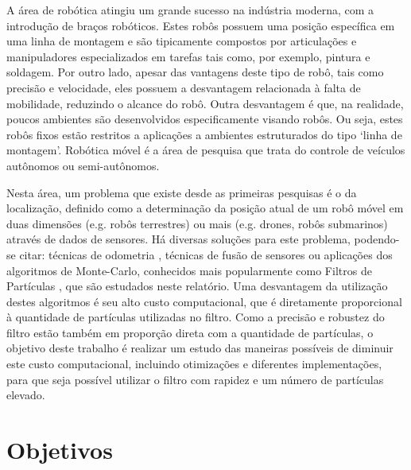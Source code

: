 \documentclass[
	12pt,				%
	openright,			%
	oneside,			%
	a4paper,			%
	english,			%
	french,				%
	spanish,			%
	brazil,				%
	]{abntex2}
\newcommand\todo[1]{~\newline{\color{red}\framebox[\columnwidth]{\parbox{.95\linewidth}{TODO: #1}}}~\newline}
\newcommand\todo[1]{}
\begin{document}
A área de robótica atingiu um grande sucesso na indústria moderna, com a introdução de braços robóticos. Estes robôs possuem uma posição específica em uma linha de montagem e são tipicamente compostos por articulações e manipuladores especializados em tarefas tais como, por exemplo, pintura e soldagem. Por outro lado, apesar das vantagens deste tipo de robô, tais como precisão e velocidade, eles possuem a desvantagem relacionada à falta de mobilidade, reduzindo o alcance do robô. Outra desvantagem é que, na realidade, poucos ambientes são desenvolvidos especificamente visando robôs. Ou seja, estes robôs fixos estão restritos a aplicações a ambientes estruturados do tipo ‘linha de montagem’. Robótica móvel \cite{NEH03,SIE04,DUD10} é a área de pesquisa que trata do controle de veículos autônomos ou semi-autônomos.\par
Nesta área, um problema que existe desde as primeiras pesquisas é o da localização, definido como a determinação da posição atual de um robô móvel em duas dimensões (e.g. robôs terrestres) ou mais (e.g. drones, robôs submarinos) através de dados de sensores. Há diversas soluções para este problema, podendo-se citar: técnicas de odometria \cite{visualodom1}, técnicas de fusão de sensores \cite{SIE04} ou aplicações dos algoritmos de Monte-Carlo, conhecidos mais popularmente como Filtros de Partículas \cite{pftuto}, que são estudados neste relatório. Uma desvantagem da utilização destes algoritmos é seu alto custo computacional, que é diretamente proporcional à quantidade de partículas utilizadas no filtro. Como a precisão e robustez do filtro estão também em proporção direta com a quantidade de partículas, o objetivo deste trabalho é realizar um estudo das maneiras possíveis de diminuir este custo computacional, incluindo otimizações e diferentes implementações, para que seja possível utilizar o filtro com rapidez e um número de partículas elevado.

\newpage


%

\section{Objetivos}
\label{sec:objetivos}
\end{document}
